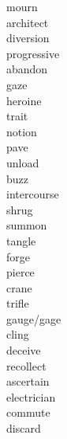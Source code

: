 \documentclass[a4paper, 11pt]{ctexart}
\begin{document}
\begin{multicols*}{3}
\begin{description}
\item[mourn]

\item[architect]

\item[diversion]

\item[progressive]

\item[abandon]

\item[gaze]

\item[heroine]

\item[trait]

\item[notion]

\item[pave]

\item[unload]

\item[buzz]

\item[intercourse]

\item[shrug]

\item[summon]

\item[tangle]

\item[forge]

\item[pierce]

\item[crane]

\item[trifle]

\item[gauge/gage]

\item[cling]

\item[deceive]

\item[recollect]

\item[ascertain]

\item[electrician]

\item[commute]

\item[discard]


\end{description}
\end{multicols*}
\end{document}
